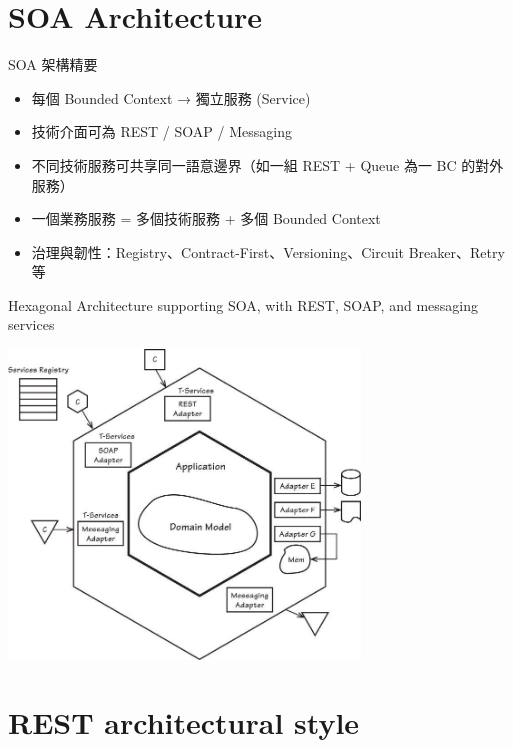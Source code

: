 \documentclass[UTF8]{beamer}
\begin{document}
\section{SOA Architecture}
\begin{frame}{SOA 架構精要}
    \begin{itemize}
        \item 每個 Bounded Context → 獨立服務 (Service)
        \item 技術介面可為 REST / SOAP / Messaging
        \item 不同技術服務可共享同一語意邊界（如一組 REST + Queue 為一 BC 的對外服務）
        \item 一個業務服務 = 多個技術服務 + 多個 Bounded Context
        \item 治理與韌性：Registry、Contract-First、Versioning、Circuit Breaker、Retry 等
    \end{itemize}
\end{frame}

\begin{frame}{Hexagonal Architecture supporting SOA, with REST, SOAP, and messaging services}
    \begin{center}
        \includegraphics[width=0.7\textwidth]{img/hexagonal-tservice.png}
    \end{center}
\end{frame}


\section{REST architectural style}
\end{document}
